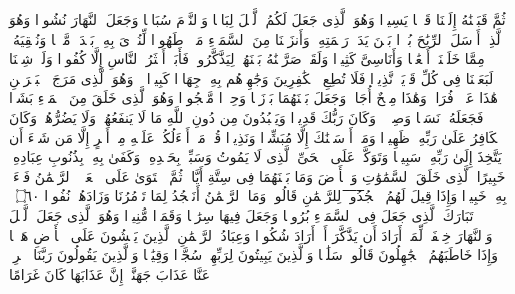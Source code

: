 \startbuffer[\q:25:46]
ثُمَّ قَبَضۡنَٰهُ إِلَیۡنَا قَبۡضࣰا یَسِیرࣰا%
\stopbuffer
\startbuffer[\q:25:47]
وَهُوَ ٱلَّذِی جَعَلَ لَكُمُ ٱلَّیۡلَ لِبَاسࣰا وَٱلنَّوۡمَ سُبَاتࣰا وَجَعَلَ ٱلنَّهَارَ نُشُورࣰا%
\stopbuffer
\startbuffer[\q:25:48]
وَهُوَ ٱلَّذِیۤ أَرۡسَلَ ٱلرِّیَٰحَ بُشۡرَۢا بَیۡنَ یَدَیۡ رَحۡمَتِهِۦۚ وَأَنزَلۡنَا مِنَ ٱلسَّمَاۤءِ مَاۤءࣰ طَهُورࣰا%
\stopbuffer
\startbuffer[\q:25:49]
لِّنُحۡۦِیَ بِهِۦ بَلۡدَةࣰ مَّیۡتࣰا وَنُسۡقِیَهُۥ مِمَّا خَلَقۡنَاۤ أَنۡعَٰمࣰا وَأَنَاسِیَّ كَثِیرࣰا%
\stopbuffer
\startbuffer[\q:25:50]
وَلَقَدۡ صَرَّفۡنَٰهُ بَیۡنَهُمۡ لِیَذَّكَّرُوا۟ فَأَبَىٰۤ أَكۡثَرُ ٱلنَّاسِ إِلَّا كُفُورࣰا%
\stopbuffer
\startbuffer[\q:25:51]
وَلَوۡ شِئۡنَا لَبَعَثۡنَا فِی كُلِّ قَرۡیَةࣲ نَّذِیرࣰا%
\stopbuffer
\startbuffer[\q:25:52]
فَلَا تُطِعِ ٱلۡكَٰفِرِینَ وَجَٰهِدۡهُم بِهِۦ جِهَادࣰا كَبِیرࣰا%
\stopbuffer
\startbuffer[\q:25:53]
۞ وَهُوَ ٱلَّذِی مَرَجَ ٱلۡبَحۡرَیۡنِ هَٰذَا عَذۡبࣱ فُرَاتࣱ وَهَٰذَا مِلۡحٌ أُجَاجࣱ وَجَعَلَ بَیۡنَهُمَا بَرۡزَخࣰا وَحِجۡرࣰا مَّحۡجُورࣰا%
\stopbuffer
\startbuffer[\q:25:54]
وَهُوَ ٱلَّذِی خَلَقَ مِنَ ٱلۡمَاۤءِ بَشَرࣰا فَجَعَلَهُۥ نَسَبࣰا وَصِهۡرࣰاۗ وَكَانَ رَبُّكَ قَدِیرࣰا%
\stopbuffer
\startbuffer[\q:25:55]
وَیَعۡبُدُونَ مِن دُونِ ٱللَّهِ مَا لَا یَنفَعُهُمۡ وَلَا یَضُرُّهُمۡۗ وَكَانَ ٱلۡكَافِرُ عَلَىٰ رَبِّهِۦ ظَهِیرࣰا%
\stopbuffer
\startbuffer[\q:25:56]
وَمَاۤ أَرۡسَلۡنَٰكَ إِلَّا مُبَشِّرࣰا وَنَذِیرࣰا%
\stopbuffer
\startbuffer[\q:25:57]
قُلۡ مَاۤ أَسۡءَلُكُمۡ عَلَیۡهِ مِنۡ أَجۡرٍ إِلَّا مَن شَاۤءَ أَن یَتَّخِذَ إِلَىٰ رَبِّهِۦ سَبِیلࣰا%
\stopbuffer
\startbuffer[\q:25:58]
وَتَوَكَّلۡ عَلَى ٱلۡحَیِّ ٱلَّذِی لَا یَمُوتُ وَسَبِّحۡ بِحَمۡدِهِۦۚ وَكَفَىٰ بِهِۦ بِذُنُوبِ عِبَادِهِۦ خَبِیرًا%
\stopbuffer
\startbuffer[\q:25:59]
ٱلَّذِی خَلَقَ ٱلسَّمَٰوَٰتِ وَٱلۡأَرۡضَ وَمَا بَیۡنَهُمَا فِی سِتَّةِ أَیَّامࣲ ثُمَّ ٱسۡتَوَىٰ عَلَى ٱلۡعَرۡشِۖ ٱلرَّحۡمَٰنُ فَسۡءَلۡ بِهِۦ خَبِیرࣰا%
\stopbuffer
\startbuffer[\q:25:60]
وَإِذَا قِیلَ لَهُمُ ٱ̅سۡ̅جُ̅دُ̅و̅ا۟̅ لِلرَّحۡمَٰنِ قَالُوا۟ وَمَا ٱلرَّحۡمَٰنُ أَنَسۡجُدُ لِمَا تَأۡمُرُنَا وَزَادَهُمۡ نُفُورࣰا ۝٦٠ ۩%
\stopbuffer
\startbuffer[\q:25:61]
تَبَارَكَ ٱلَّذِی جَعَلَ فِی ٱلسَّمَاۤءِ بُرُوجࣰا وَجَعَلَ فِیهَا سِرَٰجࣰا وَقَمَرࣰا مُّنِیرࣰا%
\stopbuffer
\startbuffer[\q:25:62]
وَهُوَ ٱلَّذِی جَعَلَ ٱلَّیۡلَ وَٱلنَّهَارَ خِلۡفَةࣰ لِّمَنۡ أَرَادَ أَن یَذَّكَّرَ أَوۡ أَرَادَ شُكُورࣰا%
\stopbuffer
\startbuffer[\q:25:63]
وَعِبَادُ ٱلرَّحۡمَٰنِ ٱلَّذِینَ یَمۡشُونَ عَلَى ٱلۡأَرۡضِ هَوۡنࣰا وَإِذَا خَاطَبَهُمُ ٱلۡجَٰهِلُونَ قَالُوا۟ سَلَٰمࣰا%
\stopbuffer
\startbuffer[\q:25:64]
وَٱلَّذِینَ یَبِیتُونَ لِرَبِّهِمۡ سُجَّدࣰا وَقِیَٰمࣰا%
\stopbuffer
\startbuffer[\q:25:65]
وَٱلَّذِینَ یَقُولُونَ رَبَّنَا ٱصۡرِفۡ عَنَّا عَذَابَ جَهَنَّمَۖ إِنَّ عَذَابَهَا كَانَ غَرَامًا%
